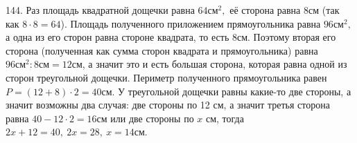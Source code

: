 144. Раз площадь квадратной дощечки равна $64\text{см}^2,$ её сторона равна 8см (так как $8\cdot8=64$). Площадь полученного приложением прямоугольника равна $96\text{см}^2,$ а одна из его сторон равна стороне квадрата, то есть 8см. Поэтому вторая его сторона (полученная как сумма сторон квадрата и прямоугольника) равна $96\text{см}^2:8\text{см}=12$см, а значит это и есть большая сторона, которая равна одной из сторон треугольной дощечки. Периметр полученного прямоугольника равен $P=(12+8)\cdot2=40$см. У треугольной дощечки равны какие-то две стороны, а значит возможны два случая: две стороны по 12 см, а значит третья сторона равна $40-12\cdot2=16$см или две стороны по $x$ см, тогда $2x+12=40,\ 2x=28,\ x=14$см.\\
